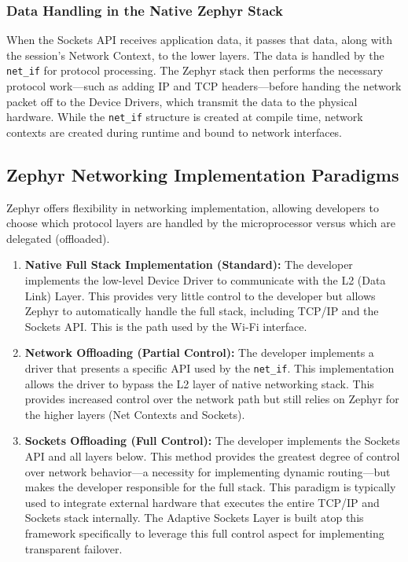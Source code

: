\subsubsection{Data Handling in the Native Zephyr Stack}
When the Sockets API receives application data, it passes that data, along with the session's Network Context, to the lower layers. The data is handled by the \texttt{net\_if} for protocol processing. The Zephyr stack then performs the necessary protocol work—such as adding IP and TCP headers—before handing the network packet off to the Device Drivers, which transmit the data to the physical hardware. While the \texttt{net\_if} structure is created at compile time, network contexts are created during runtime and bound to network interfaces.

\subsection{Zephyr Networking Implementation Paradigms}
\label{ssec:networking_paradigms}
Zephyr offers flexibility in networking implementation, allowing developers to choose which protocol layers are handled by the microprocessor versus which are delegated (offloaded).

\begin{enumerate}
    \item \textbf{Native Full Stack Implementation (Standard):} The developer implements the low-level Device Driver to communicate with the L2 (Data Link) Layer. This provides very little control to the developer but allows Zephyr to automatically handle the full stack, including TCP/IP and the Sockets API. This is the path used by the Wi-Fi interface.
    \item \textbf{Network Offloading (Partial Control):} The developer implements a driver that presents a specific API used by the \texttt{net\_if}. This implementation allows the driver to bypass the L2 layer of  native networking stack. This provides increased control over the network path but still relies on Zephyr for the higher layers (Net Contexts and Sockets).
    \item \textbf{Sockets Offloading (Full Control):} The developer implements the Sockets API and all layers below. This method provides the greatest degree of control over network behavior—a necessity for implementing dynamic routing—but makes the developer responsible for the full stack. This paradigm is typically used to integrate external hardware that executes the entire TCP/IP and Sockets stack internally. The Adaptive Sockets Layer is built atop this framework specifically to leverage this full control aspect for implementing transparent failover.
\end{enumerate}

